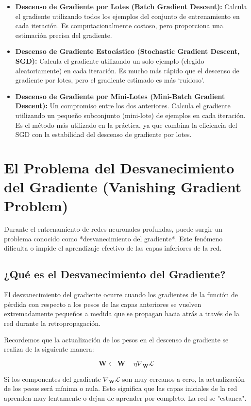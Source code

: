 \documentclass{article}
\begin{document}
\begin{itemize}
    \item \textbf{Descenso de Gradiente por Lotes (Batch Gradient Descent):} Calcula el gradiente utilizando todos los ejemplos del conjunto de entrenamiento en cada iteración.  Es computacionalmente costoso, pero proporciona una estimación precisa del gradiente.
    \item \textbf{Descenso de Gradiente Estocástico (Stochastic Gradient Descent, SGD):} Calcula el gradiente utilizando un solo ejemplo (elegido aleatoriamente) en cada iteración.  Es mucho más rápido que el descenso de gradiente por lotes, pero el gradiente estimado es más `ruidoso'.
    \item \textbf{Descenso de Gradiente por Mini-Lotes (Mini-Batch Gradient Descent):} Un compromiso entre los dos anteriores.  Calcula el gradiente utilizando un pequeño subconjunto (mini-lote) de ejemplos en cada iteración.  Es el método más utilizado en la práctica, ya que combina la eficiencia del SGD con la estabilidad del descenso de gradiente por lotes.
\end{itemize}

\section{El Problema del Desvanecimiento del Gradiente (Vanishing Gradient Problem)}

Durante el entrenamiento de redes neuronales profundas, puede surgir un problema conocido como *desvanecimiento del gradiente*. Este fenómeno dificulta o impide el aprendizaje efectivo de las capas inferiores de la red.

\subsection{¿Qué es el Desvanecimiento del Gradiente?}

El desvanecimiento del gradiente ocurre cuando los gradientes de la función de pérdida con respecto a los pesos de las capas anteriores se vuelven extremadamente pequeños a medida que se propagan hacia atrás a través de la red durante la retropropagación.

Recordemos que la actualización de los pesos en el descenso de gradiente se realiza de la siguiente manera:

\[
\mathbf{W} \leftarrow \mathbf{W} - \eta \nabla_{\mathbf{W}} \mathcal{L}
\]

Si los componentes del gradiente \(\nabla_{\mathbf{W}} \mathcal{L}\) son muy cercanos a cero, la actualización de los pesos será mínima o nula.  Esto significa que las capas iniciales de la red aprenden muy lentamente o dejan de aprender por completo. La red se "estanca".
\end{document}
